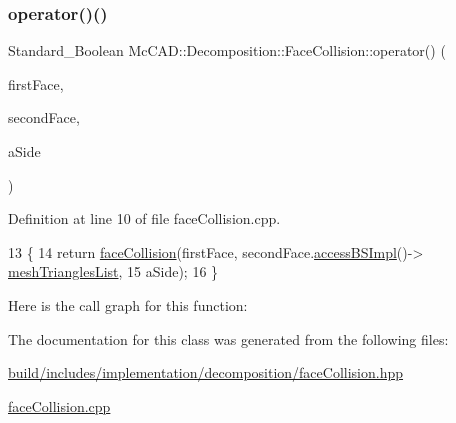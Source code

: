 \mbox{\label{classMcCAD_1_1Decomposition_1_1FaceCollision_a081f71aa83d64fca9a0d0483854f9e9d}} 
\subsubsection{\texorpdfstring{operator()()}{operator()()}\hspace{0.1cm}{\footnotesize\ttfamily [2/2]}}
{\footnotesize\ttfamily Standard\+\_\+\+Boolean Mc\+C\+A\+D\+::\+Decomposition\+::\+Face\+Collision\+::operator() (\begin{DoxyParamCaption}\item[{const \hyperlink{classMcCAD_1_1Geometry_1_1BoundSurface}{Mc\+C\+A\+D\+::\+Geometry\+::\+Bound\+Surface} \&}]{first\+Face,  }\item[{const \hyperlink{classMcCAD_1_1Geometry_1_1BoundSurface}{Mc\+C\+A\+D\+::\+Geometry\+::\+Bound\+Surface} \&}]{second\+Face,  }\item[{Standard\+\_\+\+Integer \&}]{a\+Side }\end{DoxyParamCaption})}



Definition at line 10 of file face\+Collision.\+cpp.


\begin{DoxyCode}
13                                 \{
14     \textcolor{keywordflow}{return} \hyperlink{classMcCAD_1_1Decomposition_1_1FaceCollision_ab4dffccfd15895b37362d8f4a46dff0f}{faceCollision}(firstFace, secondFace.\hyperlink{classMcCAD_1_1Geometry_1_1BoundSurface_aaf5a1d89894e9a90fee2e1f355638d0b}{accessBSImpl}()->
      \hyperlink{classMcCAD_1_1Geometry_1_1BoundSurface_1_1Impl_a707439343badaddb4fc5590b2c35e4c9}{meshTrianglesList},
15                          aSide);
16 \}
\end{DoxyCode}
Here is the call graph for this function\+:


The documentation for this class was generated from the following files\+:\begin{DoxyCompactItemize}
\item 
\hyperlink{build_2includes_2implementation_2decomposition_2faceCollision_8hpp}{build/includes/implementation/decomposition/face\+Collision.\+hpp}\item 
\hyperlink{faceCollision_8cpp}{face\+Collision.\+cpp}\end{DoxyCompactItemize}
